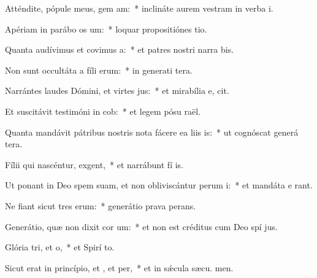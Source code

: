 \item Atténdite, pópule meus, gem am:~* inclináte aurem vestram in verba  i.
\item Apériam in parábo os um:~* loquar propositiónes  tio.
\item Quanta audívimus et covimus a:~* et patres nostri narra bis.
\item Non sunt occultáta a fíli erum:~* in generati tera.
\item Narrántes laudes Dómini, et virtes jus:~* et mirabília e,  cit.
\item Et suscitávit testimóni in cob:~* et legem pósu  raël.
\item Quanta mandávit pátribus nostris nota fácere ea liis is:~* ut cognóscat generá tera.
\item Fílii qui nascéntur,  exgent,~* et narrábunt fí is.
\item Ut ponant in Deo spem suam, et non obliviscántur perum i:~* et mandáta e rant.
\item Ne fiant sicut tres erum:~* generátio prava  perans.
\item Generátio, quæ non dixit cor um:~* et non est créditus cum Deo spí jus.
\item Glória tri, et o,~* et Spirí to.
\item Sicut erat in princípio, et , et per,~* et in sǽcula sæcu. men.
